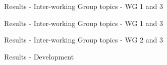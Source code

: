 \documentclass[9pt]{beamer}
\begin{document}
\begin{frame}{Results - Inter-working Group topics - WG 1 and 3}
	
	\begin{table}
		
		
		
		
	\end{table}
	
\end{frame}

\begin{frame}{Results - Inter-working Group topics - WG 1 and 3}

\begin{table}
	
	
	
	
\end{table}

\end{frame}


\begin{frame}{Results - Inter-working Group topics - WG 2 and 3}

\begin{table}




\end{table}

\end{frame}


\begin{frame}{Results - Development}
\end{frame}
\end{document}
